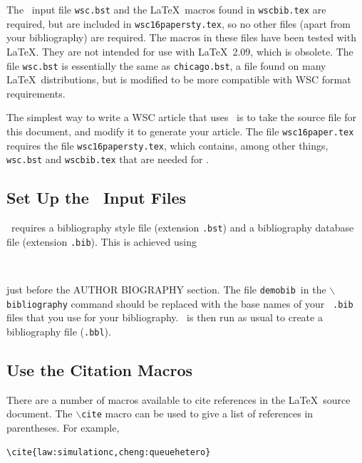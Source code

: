 \documentclass{wscpaperproc}
\theoremstyle{wsc}
\begin{document}
The \BibTeX\ input file {\tt wsc.bst} and the \LaTeX\ macros found in {\tt wscbib.tex} are required, but are included in {\tt wsc16papersty.tex}, so no other files (apart from your bibliography) are required.
The macros in these files have been tested with \LaTeX. They are not intended for use with \LaTeX\ 2.09, which is obsolete.
The file {\tt wsc.bst} is essentially the same as {\tt chicago.bst}, a file found on many \LaTeX\ distributions, but is
modified to be more compatible with WSC format requirements.

The simplest way to write a WSC article that uses \BibTeX\ is to take the source file for this document, and modify it to generate your article. The file {\tt wsc16paper.tex} requires the file {\tt wsc16papersty.tex}, which contains, among other things, {\tt wsc.bst} and {\tt wscbib.tex} that are needed for \BibTeX.

\subsection{Set Up the \BibTeX\ Input Files}

\BibTeX\ requires a bibliography style file (extension \texttt{.bst}) and a bibliography database file (extension \texttt{.bib}).  This is achieved
using\newline


\begin{verbatim}


\end{verbatim}\vspace{5mm}

\noindent just before the AUTHOR BIOGRAPHY section.  The file {\tt demobib}\ in the {\tt $\backslash$bibliography} command should be replaced with the base names of your \BibTeX\ {\tt *.bib} files that you use for your bibliography.  \BibTeX\ is then run as usual to create a bibliography file ({\tt *.bbl}).

\subsection{Use the Citation Macros}
There are a number of macros available to cite references in the \LaTeX\ source document.  The {\tt $\backslash$cite} macro can be used to give a list of references in parentheses.  For example,\newline

\begin{verbatim}
\cite{law:simulationc,cheng:queuehetero}
\end{verbatim}\vspace{5mm}
\end{document}
